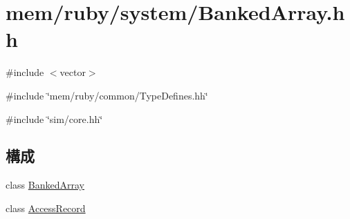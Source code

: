 \hypertarget{BankedArray_8hh}{
\section{mem/ruby/system/BankedArray.hh}
\label{BankedArray_8hh}
}
{\ttfamily \#include $<$vector$>$}\par
{\ttfamily \#include \char`\"{}mem/ruby/common/TypeDefines.hh\char`\"{}}\par
{\ttfamily \#include \char`\"{}sim/core.hh\char`\"{}}\par
\subsection*{構成}
\begin{DoxyCompactItemize}
\item 
class \hyperlink{classBankedArray}{BankedArray}
\item 
class \hyperlink{classBankedArray_1_1AccessRecord}{AccessRecord}
\end{DoxyCompactItemize}
